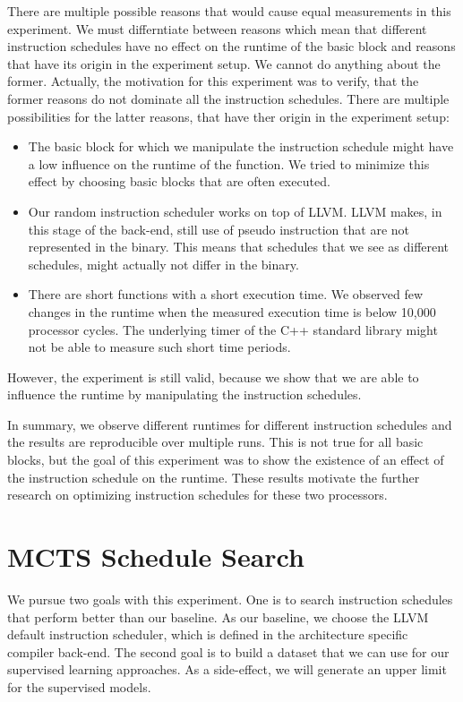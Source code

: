 There are multiple possible reasons that would cause equal measurements in this experiment.
We must differntiate between reasons which mean that different instruction schedules have no effect on the runtime of the basic block and reasons that have its origin in the experiment setup.
We cannot do anything about the former.
Actually, the motivation for this experiment was to verify, that the former reasons do not dominate all the instruction schedules.
There are multiple possibilities for the latter reasons, that have ther origin in the experiment setup:
\begin{itemize}
    \item The basic block for which we manipulate the instruction schedule might have a low influence on the runtime of the function.
        We tried to minimize this effect by choosing basic blocks that are often executed.
    \item Our random instruction scheduler works on top of LLVM.
        LLVM makes, in this stage of the back-end, still use of pseudo instruction that are not represented in the binary.
        This means that schedules that we see as different schedules, might actually not differ in the binary.
    \item There are short functions with a short execution time.
        We observed few changes in the runtime when the measured execution time is below 10,000 processor cycles.
        The underlying timer of the C++ standard library might not be able to measure such short time periods.  
\end{itemize}
However, the experiment is still valid, because we show that we are able to influence the runtime by manipulating the instruction schedules.

In summary, we observe different runtimes for different instruction schedules and the results are reproducible over multiple runs.
This is not true for all basic blocks, but the goal of this experiment was to show the existence of an effect of the instruction schedule on the runtime.
These results motivate the further research on optimizing instruction schedules for these two processors.

\section{MCTS Schedule Search}
\label{sec:eval:mcts}
We pursue two goals with this experiment.
One is to search instruction schedules that perform better than our baseline.
As our baseline, we choose the LLVM default instruction scheduler, which is defined in the architecture specific compiler back-end.
The second goal is to build a dataset that we can use for our supervised learning approaches.
As a side-effect, we will generate an upper limit for the supervised models.

